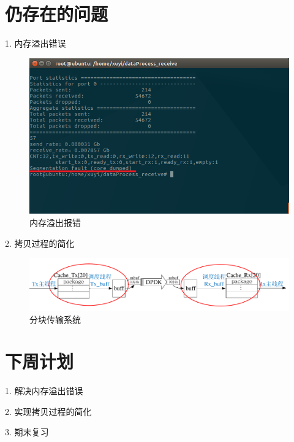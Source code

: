 \documentclass{article}
\begin{document}
\section{仍存在的问题}
1. 内存溢出错误
\begin{figure}[H]
	\centering
	\includegraphics[width = .8\textwidth]{receive_res_dumped.png}
	\caption{内存溢出报错}
\end{figure}
2. 拷贝过程的简化
\begin{figure}[H]
	\centering
	\includegraphics[width = \textwidth]{frame_sys_copy.pdf}
	\caption{分块传输系统}
\end{figure}



\section{下周计划}
1. 解决内存溢出错误

2. 实现拷贝过程的简化

3. 期末复习
\end{document}
